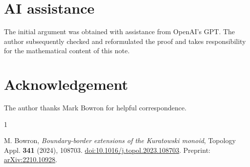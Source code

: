 \documentclass[11pt]{amsart}
\begin{document}
\section*{AI assistance}
The initial argument was obtained with assistance from OpenAI's GPT. The author subsequently checked and reformulated the proof and takes responsibility for the mathematical content of this note.

\section*{Acknowledgement}
The author thanks Mark Bowron for helpful correspondence.

\begin{thebibliography}{1}

M. Bowron,
\emph{Boundary-border extensions of the Kuratowski monoid},
Topology Appl. \textbf{341} (2024), 108703.
\href{https://doi.org/10.1016/j.topol.2023.108703}{doi:10.1016/j.topol.2023.108703}.
Preprint: \href{https://arxiv.org/abs/2210.10928}{arXiv:2210.10928}.

\end{thebibliography}
\end{document}
